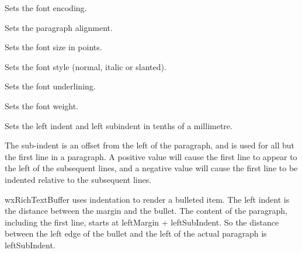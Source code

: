 Sets the font encoding.

\label{wxtextattrsetfontfacename}


Sets the paragraph alignment.

\label{wxtextattrsetfontsize}


Sets the font size in points.

\label{wxtextattrsetfontstyle}


Sets the font style (normal, italic or slanted).

\label{wxtextattrsetfontunderlined}


Sets the font underlining.

\label{wxtextattrsetfontweight}


Sets the font weight.

\label{wxtextattrsetleftindent}


Sets the left indent and left subindent in tenths of a millimetre.

The sub-indent is an offset from the left of the paragraph, and is used for all but the
first line in a paragraph. A positive value will cause the first line to appear to the left
of the subsequent lines, and a negative value will cause the first line to be indented
relative to the subsequent lines.

wxRichTextBuffer uses indentation to render a bulleted item. The left indent is the distance between
the margin and the bullet. The content of the paragraph, including the first line, starts
at leftMargin + leftSubIndent. So the distance between the left edge of the bullet and the
left of the actual paragraph is leftSubIndent.

\label{wxtextattrsetlinespacing}

